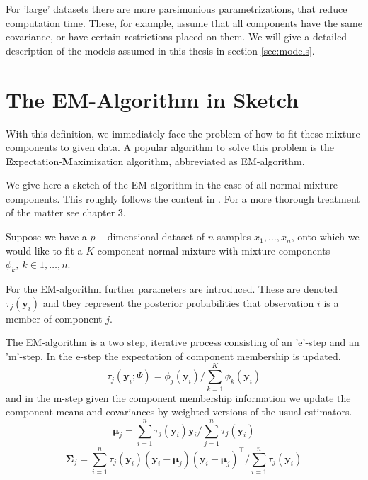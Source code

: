 
For 'large' datasets there are more parsimonious parametrizations, that reduce
computation time. These, for example, assume that all components have the same
covariance, or have certain restrictions placed on them. We will give a 
detailed description of the models assumed in this thesis in section 
\ref{sec:models}.


\section{The EM-Algorithm in Sketch}
\label{sec:sketch}

With this definition, we immediately face the problem of how to fit these
mixture components to given data. A popular algorithm to solve this problem 
is the {\bf E}xpectation-{\bf M}aximization algorithm, abbreviated as 
EM-algorithm.

We give here a sketch of the EM-algorithm in the case of all normal mixture 
components. This roughly follows the content in \cite{McL00}. For a more 
thorough treatment of the matter see chapter 3.

Suppose we have a $p-$dimensional dataset of $n$ samples $x_1, \dots ,x_n$,
onto which we would like to fit a $K$ component normal mixture with mixture
components $\phi_k,\ k \in {1,\dots , n}$. 

For the EM-algorithm further parameters are introduced. These are denoted
$\tau_j(\pmb{y}_i)$ and they represent the posterior probabilities that 
observation $i$ is a member of component $j$.

The EM-algorithm is a two step, iterative process consisting of an 'e'-step
and an 'm'-step.
In the e-step the expectation of component membership is updated.
\begin{equation} 
    \tau_j(\pmb{y}_i;\Psi) = \phi_j(\pmb{y}_i)/ \sum_{k=1}^K \phi_k(\pmb{y}_i)
\end{equation}
and in the m-step given the component membership information we update the 
component means and covariances by weighted versions of the usual estimators.
\begin{equation}
    \pmb{\mu}_j = \sum_{i=1}^n \tau_j(\pmb{y}_i)\pmb{y}_i / \sum_{j=1}^n \tau_j(\pmb{y}_i)
\end{equation}
\begin{equation}
    \pmb{\Sigma}_j = \sum_{i=1}^n \tau_j(\pmb{y}_i) (\pmb{y}_i- \pmb{\mu}_j)(\pmb{y}_i-\pmb{\mu}_j)^\top /  \sum_{i=1}^n \tau_j(\pmb{y}_i)
\end{equation}


